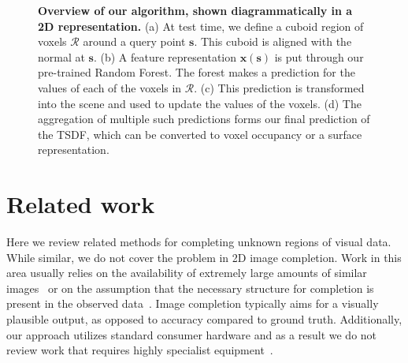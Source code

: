 \documentclass[10pt,twocolumn,letterpaper]{article}
\makeatletter
\renewcommand*{\eg}{e.g.\@\xspace}
\newcommand{\pixelidx}{\mathbf{s}}
\makeatother
\begin{document}
\begin{figure}
    \caption{\textbf{Overview of our algorithm, shown diagrammatically in a 2D representation.}
    (a) At test time, we define a cuboid region of voxels $\mathcal{R}$ around a query point $\pixelidx$.
    This cuboid is aligned with the normal at $\pixelidx$.
    (b) A feature representation $\mathbf{x}(\mathbf{s})$ is put through our pre-trained Random Forest.
    The forest makes a prediction for the values of each of the voxels in $\mathcal{R}$.
    (c) This prediction is transformed into the scene and used to update the values of the voxels.
    (d) The aggregation of multiple such predictions forms our final prediction of the TSDF, which can be converted to voxel occupancy or a surface representation.
    \label{fig:overview}
    }%
\end{figure}



\section{Related work}



Here we review related methods for completing unknown regions of visual data.
While similar, we do not cover the problem in 2D image completion.
Work in this area usually relies on the availability of extremely large amounts of similar images~\cite{hays-siggraph-2007} or on the assumption that the necessary structure for completion is present in the observed data~\cite{criminisi-cvpr-2003}.
Image completion typically aims for a visually plausible output, as opposed to accuracy compared to ground truth.
Additionally, our approach utilizes standard consumer hardware and as a result we do not review work that requires highly specialist equipment~\cite{velten-nature-2012}.


\end{document}
